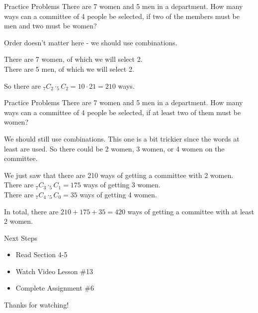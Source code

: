 \documentclass[t, aspectratio=169]{beamer}
\newcommand{\?}{\stackrel{?}{=}}
\begin{document}
	\begin{frame}{Practice Problems}
		There are 7 women and 5 men in a department. How many ways can a committee of 4 people be selected, if two of the members must be men and two must be women? \pause
		
		Order doesn't matter here - we should use combinations. \pause
		
		There are 7 women, of which we will select 2. \\
		There are 5 men, of which we will select 2. \pause
		
		So there are $_7 C _2 \cdot _5 C _2 = 10 \cdot 21 = 210$ ways.	
	\end{frame}

	\begin{frame}{Practice Problems}
		There are 7 women and 5 men in a department. How many ways can a committee of 4 people be selected, if at least two of them must be women? \pause
		
		We should still use combinations. This one is a bit trickier since the words at least are used. So there could be 2 women, 3 women, or 4 women on the committee. \pause
		
		We just saw that there are 210 ways of getting a committee with 2 women. \\ \pause
		There are $_7 C _3 \cdot _5 C _1 = 175$ ways of getting 3 women. \\ \pause
		There are $_7 C _4 \cdot _5 C _0 = 35$ ways of getting 4 women. \pause
		
		In total, there are $210 + 175 + 35 = 420$ ways of getting a committee with at least 2 women.
	\end{frame}

	\begin{frame}{Next Steps}
		\begin{itemize}
			\item Read Section 4-5
			\item Watch Video Lesson \#13
			\item Complete Assignment \#6
		\end{itemize}
	
		\vfill
		
		Thanks for watching!
	\end{frame}
	
\end{document}
